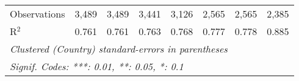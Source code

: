 \begin{table}[htbp]
\begin{tabular}{lccccccc}
      Observations                                                & 3,489        & 3,489        & 3,441        & 3,126   & 2,565         & 2,565         & 2,385\\  
      R$^2$                                                       & 0.761        & 0.761        & 0.763        & 0.768   & 0.777         & 0.778         & 0.885\\  
      \midrule
      \multicolumn{8}{l}{\emph{Clustered (Country) standard-errors in parentheses}}\\
      \multicolumn{8}{l}{\emph{Signif. Codes: ***: 0.01, **: 0.05, *: 0.1}}\\
   \end{tabular}
\end{table}


